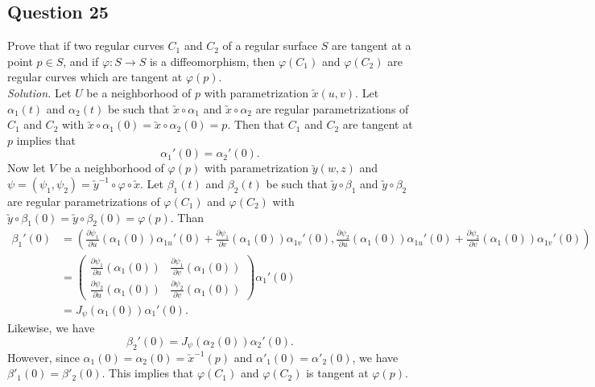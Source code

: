 \documentclass[12pt]{article}
\begin{document}
\subsection*{Question 25}
Prove that if two regular curves $C_1$ and $C_2$ of a regular surface $S$ are tangent at a point $p \in S$, and if $\varphi: S \to S$ is a diffeomorphism, then $\varphi(C_1)$ and $\varphi(C_2)$ are regular curves which are tangent at $\varphi(p)$.\\

\textit{Solution.} Let $U$ be a neighborhood of $p$ with parametrization $\utilde{x}(u,v)$. Let $\alpha_1(t)$ and $\alpha_2(t)$ be such that $\utilde{x}\circ \alpha_1$ and $\utilde{x}\circ \alpha_2$ are regular parametrizations of $C_1$ and $C_2$ with $\utilde{x}\circ \alpha_1(0) = \utilde{x}\circ \alpha_2(0)=p$. Then that $C_1$ and $C_2$ are tangent at $p$ implies that \begin{equation*}
    \alpha_1'(0) = \alpha_2'(0).
\end{equation*}
Now let $V$ be a neighborhood of $\varphi(p)$ with parametrization $\utilde{y}(w,z)$ and $\psi =(\psi_1,\psi_2)= \utilde{y}^{-1}\circ \varphi\circ \utilde{x}$. Let $\beta_1(t)$ and $\beta_2(t)$ be such that $\utilde{y}\circ \beta_1$ and $\utilde{y}\circ \beta_2$ are regular parametrizations of $\varphi(C_1)$ and $\varphi(C_2)$ with $\utilde{y}\circ \beta_1(0) = \utilde{y}\circ \beta_2(0)=\varphi(p)$. Than
\begin{align*}
    \beta_1'(0) &= \left(\frac{\partial \psi_1}{\partial u}(\alpha_{1}(0))\alpha_{1u}'(0)+\frac{\partial \psi_1}{\partial v}(\alpha_{1}(0))\alpha_{1v}'(0),\frac{\partial \psi_2}{\partial u}(\alpha_{1}(0))\alpha_{1u}'(0)+\frac{\partial \psi_2}{\partial v}(\alpha_{1}(0))\alpha_{1v}'(0)\right)\\
    &=\begin{pmatrix}
    \frac{\partial \psi_1}{\partial u}(\alpha_{1}(0))&\frac{\partial \psi_1}{\partial v}(\alpha_{1}(0))\\
    \frac{\partial \psi_2}{\partial u}(\alpha_{1}(0))&\frac{\partial \psi_2}{\partial v}(\alpha_{1}(0))
    \end{pmatrix}\alpha_1'(0)\\
    &= J_\psi(\alpha_1(0))\alpha_1'(0).
\end{align*}
Likewise, we have \begin{equation*}
    \beta_2'(0) = J_\psi(\alpha_2(0))\alpha_2'(0).
\end{equation*}
However, since $\alpha_1(0)=\alpha_2(0) = \utilde{x}^{-1}(p)$ and $\alpha'_1(0)=\alpha'_2(0)$, we have $\beta'_1(0)=\beta'_2(0)$. This implies that $\varphi(C_1)$ and $\varphi(C_2)$ is tangent at $\varphi(p)$.
\end{document}
